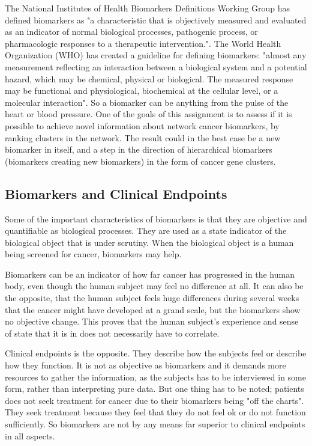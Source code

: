 The National Institutes of Health Biomarkers Definitions Working Group has
defined biomarkers as "a characteristic that is objectively measured and
evaluated as an indicator of normal biological processes, pathogenic process, or
pharmacologic responses to a therapeutic
intervention."\cite{biomarker2,biomarker3}. The World Health Organization (WHO)
has created a guideline for defining biomarkers: "almost any measurement
reflecting an interaction between a biological system and a potential hazard,
which may be chemical, physical or biological. The measured response may be
functional and physiological, biochemical at the cellular level, or a molecular
interaction". So a biomarker can be anything from the pulse of the heart or
blood pressure. One of the goals of this assignment is to assess if it is
possible to achieve novel information about network cancer biomarkers, by
ranking clusters in the network. The result could in the best case be a new
biomarker in itself, and a step in the direction of hierarchical biomarkers
(biomarkers creating new biomarkers) in the form of cancer gene clusters.

\subsection{Biomarkers and Clinical Endpoints} 
Some of the important characteristics of biomarkers is that they are objective
and quantifiable as biological processes\cite{biomarker3}. They are used as
a state indicator of the biological object that is under scrutiny. When the
biological object is a human being screened for cancer, biomarkers may help.

Biomarkers can be an indicator of how far cancer has progressed in the human
body, even though the human subject may feel no difference at all. It can also
be the opposite, that the human subject feels huge differences during several
weeks that the cancer might have developed at a grand scale, but the biomarkers
show no objective change. This proves that the human subject's experience and
sense of state that it is in does not necessarily have to correlate.

Clinical endpoints is the opposite\cite{biomarker3}. They describe how the
subjects feel or describe how they function. It is not as objective as
biomarkers and it demands more resources to gather the information, as the
subjects has to be interviewed in some form, rather than interpreting pure data.
But one thing has to be noted; patients does not seek treatment for cancer due
to their biomarkers being "off the charts". They seek treatment because they
feel that they do not feel ok or do not function sufficiently. So biomarkers are
not by any means far superior to clinical endpoints in all aspects.

